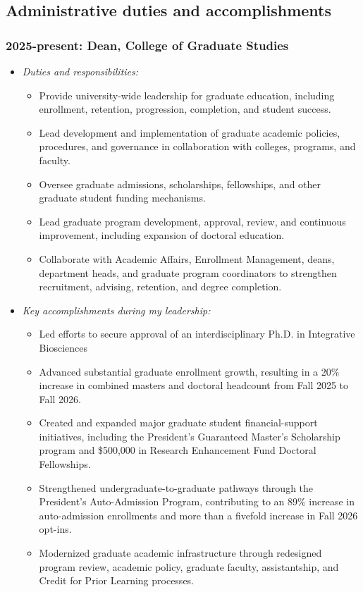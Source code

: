 \documentclass[article,10pt]{article}
\begin{document}
\subsection*{Administrative duties and accomplishments}
\label{sec:orgdaaef2e}

\subsubsection*{2025-present: Dean, College of Graduate Studies}
\label{sec:org74102c7}
\begin{itemize}
\item \emph{Duties and responsibilities:}
\begin{itemize}
\item Provide university-wide leadership for graduate education, including enrollment, retention, progression, completion, and student success.
\item Lead development and implementation of graduate academic policies, procedures, and governance in collaboration with colleges, programs, and faculty.
\item Oversee graduate admissions, scholarships, fellowships, and other graduate student funding mechanisms.
\item Lead graduate program development, approval, review, and continuous improvement, including expansion of doctoral education.
\item Collaborate with Academic Affairs, Enrollment Management, deans, department heads, and graduate program coordinators to strengthen recruitment, advising, retention, and degree completion.
\end{itemize}

\item \emph{Key accomplishments during my leadership:}
\begin{itemize}
\item Led efforts to secure approval of an interdisciplinary Ph.D. in Integrative Biosciences
\item Advanced substantial graduate enrollment growth, resulting in a 20\% increase in combined masters and doctoral headcount from Fall 2025 to Fall 2026.
\item Created and expanded major graduate student financial-support initiatives, including the President's Guaranteed Master’s Scholarship program and \$500,000 in Research Enhancement Fund Doctoral Fellowships.
\item Strengthened undergraduate-to-graduate pathways through the President's Auto-Admission Program, contributing to an 89\% increase in auto-admission enrollments and more than a fivefold increase in Fall 2026 opt-ins.
\item Modernized graduate academic infrastructure through redesigned program review, academic policy, graduate faculty, assistantship, and Credit for Prior Learning processes.
\end{itemize}
\end{itemize}
\end{document}
